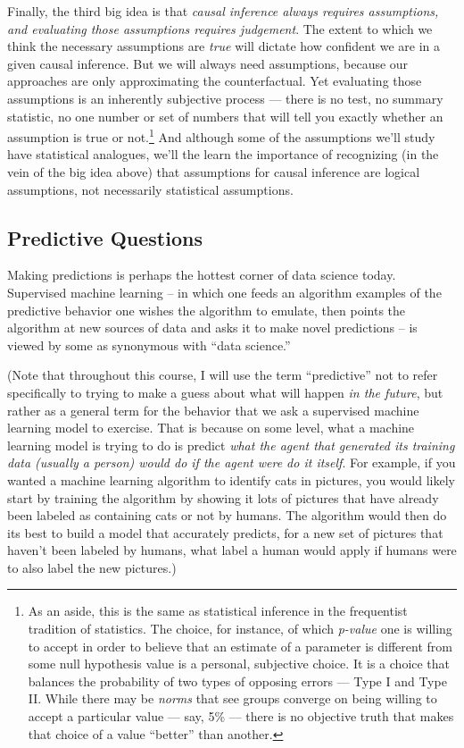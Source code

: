 \documentclass[12pt]{article}
\begin{document}
Finally, the third big idea is that \emph{causal inference always requires assumptions, and evaluating those assumptions requires judgement}.  The extent to which we think the necessary assumptions are \emph{true} will dictate how confident we are in a given causal inference.  But we will always need assumptions, because our approaches are only approximating the counterfactual.  Yet evaluating those assumptions is an inherently subjective process --- there is no test, no summary statistic, no one number or set of numbers that will tell you exactly whether an assumption is true or not.\footnote{\rmfamily As an aside, this is the same as statistical inference in the frequentist tradition of statistics.  The choice, for instance, of which \emph{p-value} one is willing to accept in order to believe that an estimate of a parameter is different from some null hypothesis value is a personal, subjective choice.  It is a choice that balances the probability of two types of opposing errors --- Type I and Type II.  While there may be \emph{norms} that see groups converge on being willing to accept a particular value --- say, 5\% --- there is no objective truth that makes that choice of a value ``better'' than another.}  And although some of the assumptions we'll study have statistical analogues, we'll the learn the importance of recognizing (in the vein of the big idea above) that assumptions for causal inference are logical assumptions, not necessarily statistical assumptions.

\subsection{Predictive Questions}

Making predictions is perhaps the hottest corner of data science today. Supervised machine learning -- in which one feeds an algorithm examples of the predictive behavior one wishes the algorithm to emulate, then points the algorithm at new sources of data and asks it to make novel predictions -- is viewed by some as synonymous with ``data science.''

(Note that throughout this course, I will use the term ``predictive'' not to refer specifically to trying to make a guess about what will happen \emph{in the future}, but rather as a general term for the behavior that we ask a supervised machine learning model to exercise. That is because on some level, what a machine learning model is trying to do is predict \emph{what the agent that generated its training data (usually a person) would do if the agent were do it itself}. For example, if you wanted a machine learning algorithm to identify cats in pictures, you would likely start by training the algorithm by showing it lots of pictures that have already been labeled as containing cats or not by humans. The algorithm would then do its best to build a model that accurately predicts, for a new set of pictures that haven't been labeled by humans, what label a human  would apply if humans were to also label the new pictures.)
\end{document}
